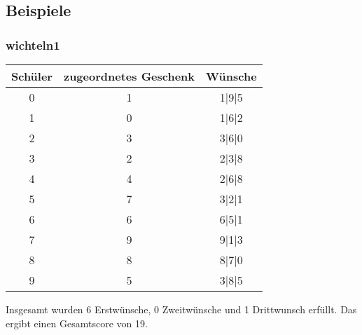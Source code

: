 \documentclass[a4paper, 12pt]{scrartcl}
\begin{document}
\subsection{Beispiele}

\subsubsection{wichteln1}
\begin{table}[H]
    \centering
\begin{tabular}{@{}ccc@{}}
\toprule
Schüler & zugeordnetes Geschenk & Wünsche               \\ \midrule
0        &     1                &  1|9|5    \\
1        &     0                &  1|6|2    \\
2        &     3                &  3|6|0    \\
3        &     2                &  2|3|8    \\
4        &     4                &  2|6|8    \\
5        &     7                &  3|2|1    \\
6        &     6                &  6|5|1    \\
7        &     9                &  9|1|3    \\
8        &     8                &  8|7|0    \\
9        &     5                &  3|8|5    \\
    \bottomrule

\end{tabular}
\end{table}

Insgesamt wurden 6 Erstwünsche, 0 Zweitwünsche und 1 Drittwunsch erfüllt. Das ergibt einen Gesamtscore von 19.
\end{document}
